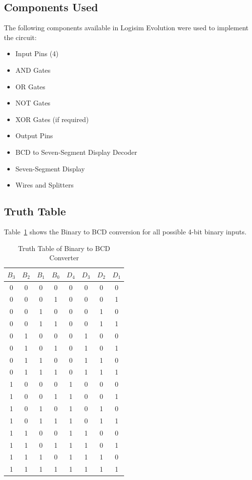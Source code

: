 \documentclass[12pt,a4paper]{article}
\begin{document}
\subsection{Components Used}

The following components available in Logisim Evolution were used to implement the circuit:

\begin{itemize}
    \item Input Pins (4)
    \item AND Gates
    \item OR Gates
    \item NOT Gates
    \item XOR Gates (if required)
    \item Output Pins
    \item BCD to Seven-Segment Display Decoder
    \item Seven-Segment Display
    \item Wires and Splitters
\end{itemize}

\subsection{Truth Table}

Table~\ref{tab:bcdtruth} shows the Binary to BCD conversion for all possible 4-bit binary inputs.

\begin{table}[H]
\centering
\caption{Truth Table of Binary to BCD Converter}
\label{tab:bcdtruth}
\renewcommand{\arraystretch}{1.2}
\begin{tabular}{|c|c|c|c||c|c|c|c|}
\hline
$B_3$ & $B_2$ & $B_1$ & $B_0$ & $D_4$ & $D_3$ & $D_2$ & $D_1$\\
\hline
0&0&0&0&0&0&0&0\\
0&0&0&1&0&0&0&1\\
0&0&1&0&0&0&1&0\\
0&0&1&1&0&0&1&1\\
0&1&0&0&0&1&0&0\\
0&1&0&1&0&1&0&1\\
0&1&1&0&0&1&1&0\\
0&1&1&1&0&1&1&1\\
1&0&0&0&1&0&0&0\\
1&0&0&1&1&0&0&1\\
1&0&1&0&1&0&1&0\\
1&0&1&1&1&0&1&1\\
1&1&0&0&1&1&0&0\\
1&1&0&1&1&1&0&1\\
1&1&1&0&1&1&1&0\\
1&1&1&1&1&1&1&1\\
\hline
\end{tabular}
\end{table}
\end{document}
